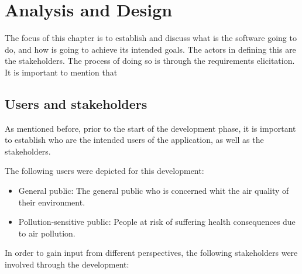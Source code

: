 \chapter{Analysis and Design}
The focus of this chapter is to establish and discuss what is the software going to do, and how is going to achieve its intended goals. The actors in defining this are the stakeholders. The process of doing so is through the requirements elicitation. It is important to mention that  

\section{Users and stakeholders}
As mentioned before, prior to the start of the development phase, it is important to establish who are the intended users of the application, as well as the stakeholders. 

The following users were depicted for this development:

\begin{itemize}
	\item General public: The general public who is concerned whit the air quality of their environment.
    \item Pollution-sensitive public: People at risk of suffering health consequences due to air pollution.
\end{itemize}

In order to gain input from different perspectives, the following stakeholders were involved through the development: 

